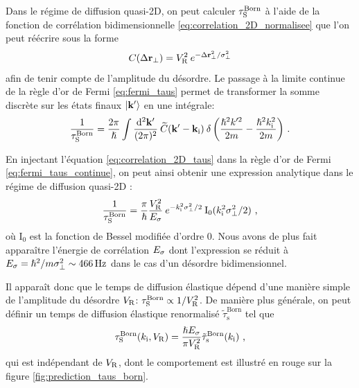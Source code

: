 Dans le régime de diffusion quasi-2D, on peut calculer $\tau_{\mathrm{S}}^{\mathrm{Born}}$ à l'aide de la fonction de corrélation bidimensionnelle \ref{eq:correlation_2D_normalisee} que l'on peut réécrire sous la forme
\begin{equation}
C(\Delta \mathbf{r}_\perp)=V_{\mathrm{R}}^2 \: e^{-\Delta\mathbf{r}_\perp^2/\sigma_{\perp}^2}
\label{eq:correlation_2D_taus}
\end{equation}
afin de tenir compte de l'amplitude du désordre. Le passage à la limite continue de la règle d'or de Fermi \ref{eq:fermi_taus} permet de transformer la somme discrète sur les états finaux $\left| \mathbf{k}' \right\rangle$ en une intégrale:
\begin{equation}
\frac{1}{\tau_{\mathrm{S}}^{\mathrm{Born}}}=\frac{2\pi}{\hslash} \int{\frac{\mathop{}\mathopen{}\mathrm{d}^2 \mathbf{k}'}{(2\pi)^2} \: \widetilde{C}(\mathbf{k}'-\mathbf{k}_{\mathrm{i}}) \: \delta\left(\frac{\hslash^2 k'^2}{2m}-\frac{\hslash^2k_{\mathrm{i}}^2}{2m}\right)} \text{ .}
\label{eq:fermi_taus_continue}
\end{equation}

En injectant l'équation \ref{eq:correlation_2D_taus} dans la règle d'or de Fermi \ref{eq:fermi_taus_continue}, on peut ainsi obtenir une expression analytique dans le régime de diffusion quasi-2D \citep{shapiro2012cold}:
\begin{equation}
\frac{1}{\tau_{\mathrm{S}}^{\mathrm{Born}} }=\frac{\pi}{\hslash} \frac{V_{\mathrm{R}}^2}{E_{\sigma}} \: e^{- k_{\mathrm{i}}^2 \sigma_{\perp}^2 /2} \: \mathrm{I_0}(k_{\mathrm{i}}^2 \sigma_{\perp}^2 /2) \text{ ,}
\label{eq:taus_born_2D}
\end{equation}
où $\mathrm{I_0}$ est la fonction de Bessel modifiée d'ordre 0. Nous avons de plus fait apparaître l'énergie de corrélation $E_{\sigma}$ dont l'expression se réduit à $E_{\sigma}=\hslash^2/m\sigma_{\perp}^2\sim\SI{466}{\hertz}$ dans le cas d'un désordre bidimensionnel.

Il apparaît donc que le temps de diffusion élastique dépend d'une manière simple de l'amplitude du désordre $V_{\mathrm{R}}$: $\tau_{\mathrm{S}}^{\mathrm{Born}} \propto 1/V_{\mathrm{R}}^2$. De manière plus générale, on peut définir un temps de diffusion élastique renormalisé $\tilde{\tau}_{\mathrm{s}}^{\mathrm{Born}}$ tel que
\begin{equation}
\tau_{\mathrm{S}}^{\mathrm{Born}} (k_{\mathrm{i}},V_{\mathrm{R}})=\frac{\hslash E_{\sigma}}{\pi V_{\mathrm{R}}^2} \tilde{\tau}_{\mathrm{s}}^{\mathrm{Born}} (k_{\mathrm{i}}) \text{ ,}
\end{equation}
qui est indépendant de $V_{\mathrm{R}}$, dont le comportement est illustré en rouge sur la figure \ref{fig:prediction_taus_born}.

